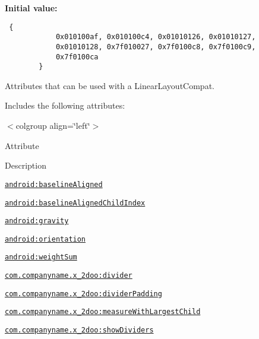 \textbf{Initial value:}

\begin{Code}\begin{verbatim} {
            0x010100af, 0x010100c4, 0x01010126, 0x01010127,
            0x01010128, 0x7f010027, 0x7f0100c8, 0x7f0100c9,
            0x7f0100ca
        }
\end{verbatim}
\end{Code}
Attributes that can be used with a LinearLayoutCompat. 

Includes the following attributes: \begin{TabularC}{0}
\hline
\end{TabularC}
$<$colgroup align=\char`\"{}left\char`\"{}$>$ 

Attribute

Description 

{\tt \hyperlink{classandroid_1_1support_1_1v4_1_1_r_1_1styleable_8ff8a96f123f37d28206811c345732e4}{android:baselineAligned}}

{\tt \hyperlink{classandroid_1_1support_1_1v4_1_1_r_1_1styleable_03736db57a910e8d6ce3bc7dc999fcfe}{android:baselineAlignedChildIndex}}

{\tt \hyperlink{classandroid_1_1support_1_1v4_1_1_r_1_1styleable_1eb5d592245dd2ab2fe144f2aea87553}{android:gravity}}

{\tt \hyperlink{classandroid_1_1support_1_1v4_1_1_r_1_1styleable_2fab5c4e37d706c344112f0c3adfdeda}{android:orientation}}

{\tt \hyperlink{classandroid_1_1support_1_1v4_1_1_r_1_1styleable_8f749702d3ee9fc29c39a04661dd9b91}{android:weightSum}}

{\tt \hyperlink{classandroid_1_1support_1_1v4_1_1_r_1_1styleable_678fcd55c5a19e3fde49a5ec33331fd9}{com.companyname.x\_\-2doo:divider}}

{\tt \hyperlink{classandroid_1_1support_1_1v4_1_1_r_1_1styleable_00ee5a3b1918e743d8959a4de0289516}{com.companyname.x\_\-2doo:dividerPadding}}

{\tt \hyperlink{classandroid_1_1support_1_1v4_1_1_r_1_1styleable_8b8d65edcdf29ccafcc0df613960971f}{com.companyname.x\_\-2doo:measureWithLargestChild}}

{\tt \hyperlink{classandroid_1_1support_1_1v4_1_1_r_1_1styleable_fe02967a715f53721d56bd6750def3f6}{com.companyname.x\_\-2doo:showDividers}}

